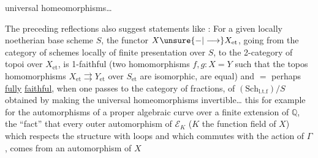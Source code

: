 universal homeomorphisms\ldots

The preceding reflections also suggest statements like   : For a given locally noetherian base scheme $S$,
the functor $X\unsure{-|\longrightarrow}X_{\mathrm{et}}$, going from the category of  schemes locally of finite presentation  over $S$, to the 2-category of topoi over $X_{\mathrm{et}}$, is  1-faithful (two homomorphisms $f,g:X=Y$ such that the topos homomorphisms  $X_{\mathrm{et}}\rightrightarrows Y_{\mathrm{et}}$ over $S_{\mathrm{et}}$ are  isomorphic, are equal) and $=$ perhaps \uline{fully} \uline{faithful}, when one passes to the category of fractions, of $(\mathrm{Sch}_{\mathrm{l.t.f}})/S$ obtained by making the universal homeomorphisms invertible\ldots {}  this for example for the automorphisms of a proper algebraic curve over a finite extension of $\mathbb{Q}$,   the ``fact'' that every outer automorphism of $\mathcal E_K$ ($K$ the function field of $X$) which respects the structure with loops and which commutes with the action of $\Gamma$, comes from an automorphism of $X$

